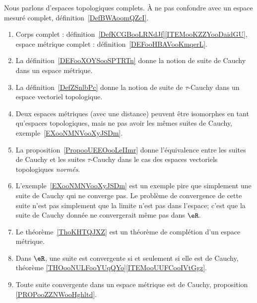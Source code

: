      \label{THMooOCXTooWenIJE}

Nous parlons d'espaces topologiques complets. À ne pas confondre avec un espace mesuré complet, définition~\ref{DefBWAoomQZcI}.

\begin{enumerate}
    \item
        Corps complet : définition~\ref{DefKCGBooLRNdJf}\ref{ITEMooKZZYooDaidGU}, espace métrique complet : définition~\ref{DEFooHBAVooKmqerL}.
    \item
        La définition~\ref{DEFooXOYSooSPTRTn} donne la notion de suite de Cauchy dans un espace métrique.
    \item
        La définition~\ref{DefZSnlbPc} donne la notion de suite de \( \tau\)-Cauchy dans un espace vectoriel topologique.
    \item
        Deux espaces métriques (avec une distance) peuvent être isomorphes en tant qu'espaces topologiques, mais ne pas avoir les mêmes suites de Cauchy, exemple~\ref{EXooNMNVooXyJSDm}.
    \item
        La proposition~\ref{PropooUEEOooLeIImr} donne l'équivalence entre les suites de Cauchy et les suites \( \tau\)-Cauchy dans le cas des espaces vectoriels topologiques \emph{normés}.
    \item
        L'exemple~\ref{EXooNMNVooXyJSDm} est un exemple pire que simplement une suite de Cauchy qui ne converge pas. Le problème de convergence de cette suite n'est pas simplement que la limite n'est pas dans l'espace; c'est que la suite de Cauchy donnée ne convergerait même pas dans \( \eR\).
    \item
        Le théorème~\ref{ThoKHTQJXZ} est un théorème de complétion d'un espace métrique.
    \item
        Dans \( \eR\), une suite est convergente si et seulement si elle est de Cauchy, théorème \ref{THOooNULFooYUqQYo}\ref{ITEMooUUFCooIVtGgz}.
    \item
        Toute suite convergente dans un espace métrique est de Cauchy, proposition \ref{PROPooZZNWooHghltd}.
\end{enumerate}

